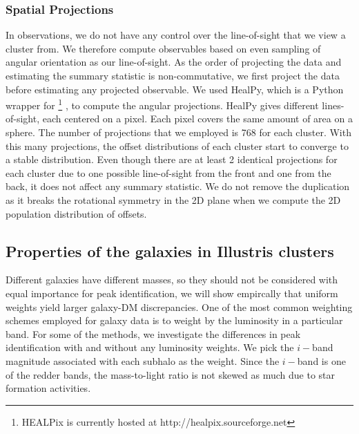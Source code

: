 \subsubsection{Spatial Projections}
\label{subsubsec:projections}
In observations, we do not have any control over the line-of-sight that we view a
cluster from. 
We therefore compute observables based on even sampling of angular orientation 
as our line-of-sight.
As the order of projecting the data and estimating the summary statistic is
non-commutative, we first project the data before estimating any projected 
observable. 
We used {\sc HealPy},
which is a {\sc Python} wrapper for
{}\footnote{HEALPix is
currently hosted at http://healpix.sourceforge.net}
\citep{Gorski2005}, to compute the angular projections. {\sc HealPy} gives different
lines-of-sight, each centered on a {}
pixel. Each pixel covers the same amount of area on a sphere. 
The number of projections that we employed is 768 for each cluster. With this
many projections, the offset distributions of each cluster start to converge to a
stable distribution. 
Even though there are at least 2 identical projections for each cluster due to
one possible line-of-sight from the front and one from the back, it does not
affect any summary statistic. We do not remove the duplication as it breaks
the rotational symmetry in the 2D plane when we compute the 2D population
distribution of offsets.  


\subsection{Properties of the galaxies in Illustris clusters}
\label{subsec:galaxy_properties}

Different galaxies have different masses, so they should not be considered with equal
importance for peak identification, we will show empircally that uniform
weights yield larger galaxy-DM discrepancies. One of the most common weighting schemes employed for galaxy data is to weight
by the luminosity in a particular band. For some of the methods, we investigate
the differences in peak identification with and without any luminosity weights.
We pick the $i-$band magnitude
associated with each subhalo as the weight. Since the $i-$band is
one of the redder bands, the mass-to-light ratio is not skewed as much due to star
formation activities. 


